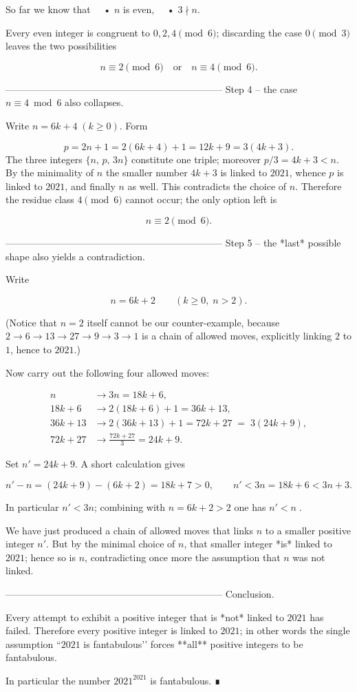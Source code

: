 So far we know that  
 • \(n\) is even,  
 • \(3\nmid n\).  

Every even integer is congruent to \(0,2,4\pmod 6\); discarding the
case \(0\pmod 3\) leaves the two possibilities

\[
n\equiv 2\pmod 6\quad\text{or}\quad n\equiv 4\pmod 6 .
\]

--------------------------------------------------------------------
Step 4 –  the case \(n\equiv 4\bmod 6\) also collapses.

Write \(n=6k+4 \;(k\ge 0)\).
Form

\[
p=2n+1=2(6k+4)+1=12k+9=3(4k+3).
\]
The three integers
\(\bigl\{n,\,p,\,3n\bigr\}\) constitute one triple; moreover
\(p/3=4k+3<n\).
By the minimality of \(n\) the smaller number \(4k+3\) is linked to
\(2021\), whence \(p\) is linked to \(2021\), and finally \(n\) as well.
This contradicts the choice of \(n\).
Therefore the residue class \(4\pmod 6\) cannot occur; the only option
left is

\[
n\equiv 2\pmod 6 .
\]

--------------------------------------------------------------------
Step 5 –  the *last* possible shape also yields a contradiction.

Write

\[
n=6k+2\qquad(k\ge 0,\;n>2).
\]

(Notice that \(n=2\) itself cannot be our counter-example, because
\(2\to 6\to13\to27\to9\to3\to1\) is a chain of allowed moves,
explicitly linking \(2\) to \(1\), hence to \(2021\).)

Now carry out the following four allowed moves:

\[
\begin{aligned}
n&\longrightarrow 3n=18k+6,\\[2pt]
18k+6&\longrightarrow 2(18k+6)+1=36k+13,\\[2pt]
36k+13&\longrightarrow 2(36k+13)+1=72k+27
       \;=\;3(24k+9),\\[2pt]
72k+27&\longrightarrow\tfrac{72k+27}{3}=24k+9.
\end{aligned}
\]

Set \(n' = 24k+9\).  A short calculation gives

\[
n' - n = (24k+9)-(6k+2)=18k+7>0,
\qquad
n' < 3n = 18k+6 < 3n + 3 .
\]

In particular \(n' < 3n\); combining with \(n=6k+2>2\) one has
\(
n'<n\;.
\)

We have just produced a chain of allowed moves that links \(n\) to a
smaller positive integer \(n'\).  
But by the minimal choice of \(n\), that smaller integer *is* linked to
\(2021\); hence so is \(n\), contradicting once more the assumption that
\(n\) was not linked.

--------------------------------------------------------------------
Conclusion.

Every attempt to exhibit a positive integer that is *not* linked to
\(2021\) has failed.  
Therefore every positive integer is linked to \(2021\); in other words
the single assumption “\(2021\) is fantabulous’’ forces **all**
positive integers to be fantabulous.  

In particular the number \(2021^{2021}\) is fantabulous. ∎
